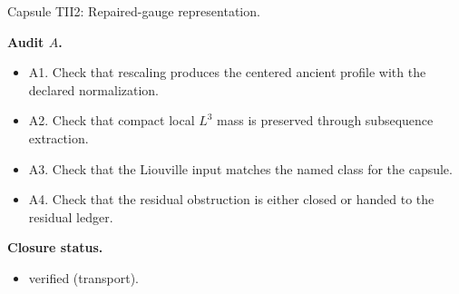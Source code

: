 \documentclass[11pt]{amsart}
\newcommand{\capsulefield}[1]{\par\smallskip\noindent\textbf{#1.}\ }
\begin{document}
\begin{proofcapsule}{Capsule TII2: Repaired-gauge representation.}
  \capsulefield{Audit \(A\)}
  \begin{itemize}[leftmargin=1.8em]
  \item A1. Check that rescaling produces the centered ancient profile with the declared normalization.
  \item A2. Check that compact local $L^3$ mass is preserved through subsequence extraction.
  \item A3. Check that the Liouville input matches the named class for the capsule.
  \item A4. Check that the residual obstruction is either closed or handed to the residual ledger.
  \end{itemize}
  \capsulefield{Closure status}
  \begin{itemize}[leftmargin=1.8em]
  \item verified (transport).
  \end{itemize}
\end{proofcapsule}
\end{document}
